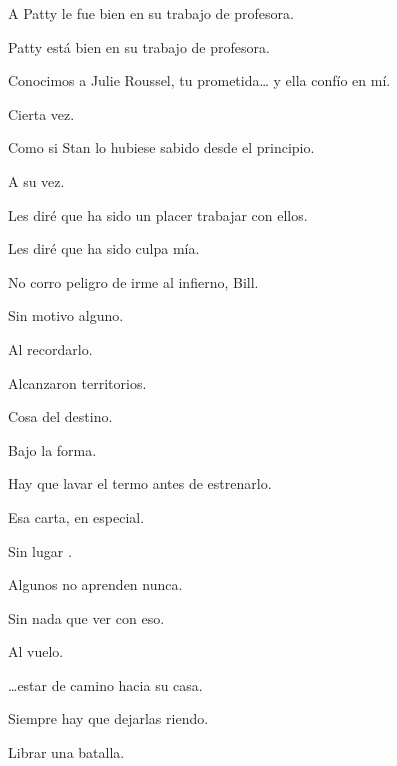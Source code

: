 \sk
A Patty le fue bien en su trabajo de profesora. 

\sk
Patty está bien en su trabajo de profesora. 

\sk
Conocimos a Julie Roussel, tu prometida\ldots{} y ella confío en mí. 

\sk
Cierta vez. 

\sk
Como si Stan lo hubiese sabido desde el principio. 

\sk
A su vez. 

\sk
Les diré que ha sido un placer trabajar con ellos. 

\sk
Les diré que ha sido culpa mía. 

\sk
No corro peligro de irme al infierno, Bill. 

\sk
Sin motivo alguno. 

\sk
Al recordarlo. 

\sk
Alcanzaron territorios. 

\sk
Cosa del destino. 

\sk
Bajo la forma. 

\sk
Hay que lavar el termo antes de estrenarlo. 

\sk
Esa carta, en especial. 

\sk
Sin lugar . 

\sk
Algunos no aprenden nunca. 

\sk
Sin nada que ver con eso. 

\sk
Al vuelo. 

\sk
{} 

\sk
\ldots{}estar de camino hacia su casa. 

\sk
Siempre hay que dejarlas riendo. 

\sk
Librar una batalla. 

